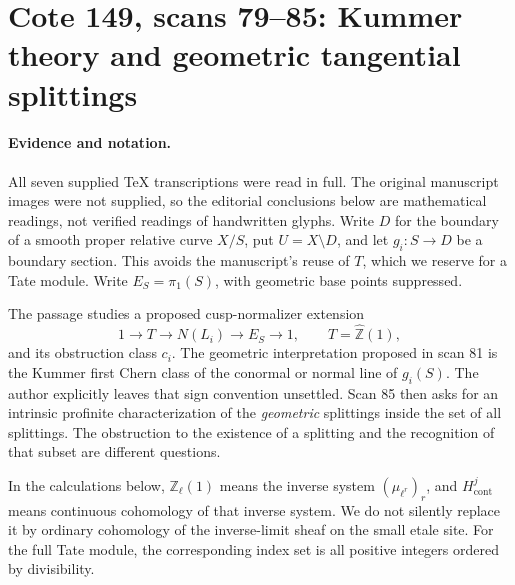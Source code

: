 \section{Cote 149, scans 79--85: Kummer theory and geometric tangential splittings}
\label{sec:archive-kummer}

\paragraph{Evidence and notation.}
All seven supplied TeX transcriptions were read in full.  The original
manuscript images were not supplied, so the editorial conclusions below are
mathematical readings, not verified readings of handwritten glyphs.  Write
\(D\) for the boundary of a smooth proper relative curve \(X/S\), put
\(U=X\setminus D\), and let \(g_i:S\longrightarrow D\) be a boundary section.
This avoids the manuscript's reuse of \(T\), which we reserve for a Tate module.
Write \(E_S=\pi_1(S)\), with geometric base points suppressed.

The passage studies a proposed cusp-normalizer extension
\begin{equation}\label{eq:arc-normalizer}
 1\longrightarrow T\longrightarrow N(L_i)
   \longrightarrow E_S\longrightarrow 1,
 \qquad T=\widehat{\mathbb Z}(1),
\end{equation}
and its obstruction class \(c_i\).  The geometric interpretation proposed in
scan 81 is the Kummer first Chern class of the conormal or normal line of
\(g_i(S)\).  The author explicitly leaves that sign convention unsettled.
Scan 85 then asks for an intrinsic profinite characterization of the
\emph{geometric} splittings inside the set of all splittings.  The obstruction
to the existence of a splitting and the recognition of that subset are
different questions.

In the calculations below, \(\mathbb Z_\ell(1)\) means the inverse system
\((\mu_{\ell^r})_r\), and \(H^j_{\mathrm{cont}}\) means continuous
cohomology of that inverse system.  We do not silently replace it by
ordinary cohomology of the inverse-limit sheaf on the small etale site.
For the full Tate module, the corresponding index set is all positive
integers ordered by divisibility.

